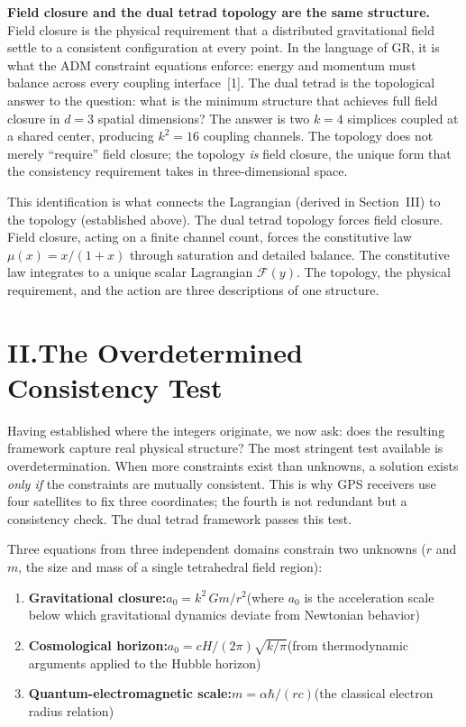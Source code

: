 \documentclass[11pt]{article}
\begin{document}
\textbf{Field closure and the dual tetrad topology are the same structure.}\quad
Field closure is the physical requirement that a distributed gravitational field settle to a consistent configuration at every point.
In the language of GR, it is what the ADM constraint equations enforce: energy and momentum must balance across every coupling interface~[1].
The dual tetrad is the topological answer to the question: what is the minimum structure that achieves full field closure in $d = 3$ spatial dimensions?
The answer is two $k = 4$ simplices coupled at a shared center, producing $k^2 = 16$ coupling channels.
The topology does not merely ``require'' field closure; the topology \emph{is} field closure, the unique form that the consistency requirement takes in three-dimensional space.

This identification is what connects the Lagrangian (derived in Section~III) to the topology (established above).
The dual tetrad topology forces field closure.
Field closure, acting on a finite channel count, forces the constitutive law $\mu(x) = x/(1+x)$ through saturation and detailed balance.
The constitutive law integrates to a unique scalar Lagrangian $\mathcal{F}(y)$.
The topology, the physical requirement, and the action are three descriptions of one structure.

\section*{II.\quad The Overdetermined Consistency Test}

Having established where the integers originate, we now ask: does the resulting framework capture real physical structure?
The most stringent test available is overdetermination.
When more constraints exist than unknowns, a solution exists \emph{only if} the constraints are mutually consistent.
This is why GPS receivers use four satellites to fix three coordinates; the fourth is not redundant but a consistency check.
The dual tetrad framework passes this test.

Three equations from three independent domains constrain two unknowns ($r$ and $m$, the size and mass of a single tetrahedral field region):

\begin{enumerate}[leftmargin=2em]
\item \textbf{Gravitational closure:}\quad $a_0 = k^2\,Gm/r^2$\quad (where $a_0$ is the acceleration scale below which gravitational dynamics deviate from Newtonian behavior)
\item \textbf{Cosmological horizon:}\quad $a_0 = cH/(2\pi)\sqrt{k/\pi}$\quad (from thermodynamic arguments applied to the Hubble horizon)
\item \textbf{Quantum-electromagnetic scale:}\quad $m = \alpha\hbar/(rc)$\quad (the classical electron radius relation)
\end{enumerate}
\end{document}
